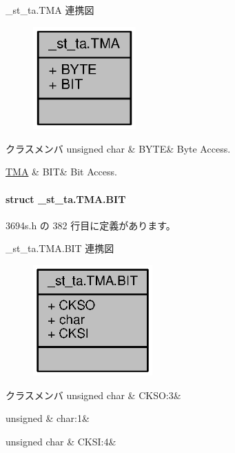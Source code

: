 \+\_\+st\+\_\+ta.\+T\+M\+A 連携図
\nopagebreak
\begin{figure}[H]
\begin{center}
\leavevmode
\includegraphics[width=112pt]{dd/de4/union__st__ta_8TMA__coll__graph}
\end{center}
\end{figure}
\begin{DoxyFields}{クラスメンバ}
unsigned char\label{3694s_8h_ae409eb2ba6eb6801f52763ae370c350e}
&
B\+Y\+T\+E&
Byte Access. \\
\hline

\hyperlink{3694s_8h_d6/de9/struct__st__ta_8TMA_8BIT}{T\+M\+A}\label{3694s_8h_adb957fdc8000e1eef04a243f5199aa52}
&
B\+I\+T&
Bit Access. \\
\hline

\end{DoxyFields}
\label{struct__st__ta_8TMA_8BIT}
\paragraph{struct \+\_\+st\+\_\+ta.\+T\+M\+A.\+B\+I\+T}


 3694s.\+h の 382 行目に定義があります。



\+\_\+st\+\_\+ta.\+T\+M\+A.\+B\+I\+T 連携図
\nopagebreak
\begin{figure}[H]
\begin{center}
\leavevmode
\includegraphics[width=130pt]{da/d9d/struct__st__ta_8TMA_8BIT__coll__graph}
\end{center}
\end{figure}
\begin{DoxyFields}{クラスメンバ}
unsigned char\label{3694s_8h_ac8d44b0674222a2826bdfa8dbfc86f6b}
&
C\+K\+S\+O\+:3&
\\
\hline

unsigned\label{3694s_8h_aa87deb01c5f539e6bda34829c8ef2368}
&
char\+:1&
\\
\hline

unsigned char\label{3694s_8h_a017d13a6e651ace1251d54182ee5c106}
&
C\+K\+S\+I\+:4&
\\
\hline

\end{DoxyFields}
\label{union__st__sci3_8SMR}
